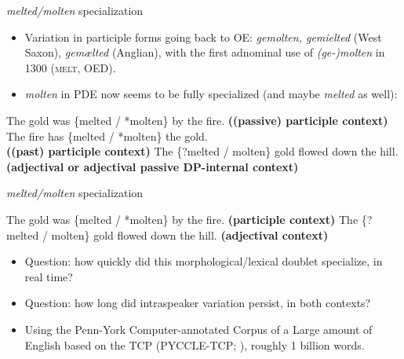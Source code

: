 \documentclass[hyperref={pdfpagelabels=false}]{beamer}
\begin{document}
\begin{frame}{\textsl{melted/molten} specialization}
\begin{itemize}
\item Variation in participle forms going back to OE: \textsl{gemolten, gemielted} (West Saxon), \textsl{gemælted} (Anglian), with the first adnominal use of \textsl{(ge-)molten} in 1300 (\textsc{melt}, OED).
\item \textsl{molten} in PDE now seems to be fully specialized (and maybe \textsl{melted} as well):
\end{itemize}
\begin{exe}
	\ex The gold was \{melted / *molten\} by the fire. \textbf{((passive) participle context)}
	\ex The fire has  \{melted / *molten\} the gold.\\\textbf{((past) participle context)}
	\ex The \{?melted / molten\} gold flowed down the hill. \textbf{(adjectival or adjectival passive DP-internal context)}
\end{exe}

\end{frame}

\begin{frame}{\textsl{melted/molten} specialization}
\begin{exe}
	\ex The gold was \{melted / *molten\} by the fire. \textbf{(participle context)}
	\ex The \{?melted / molten\} gold flowed down the hill. \textbf{(adjectival context)}
\end{exe}
\begin{itemize}
\item Question: how quickly did this morphological/lexical doublet specialize, in real time?

\item Question: how long did intraspeaker variation persist, in both contexts?
\item Using the {P}enn-{Y}ork {C}omputer-annotated {C}orpus of a {L}arge amount of {E}nglish based on the {TCP (PYCCLE-TCP; \citealt{pyccle})}, roughly 1 billion words.
\end{itemize}
\end{frame}
\end{document}
